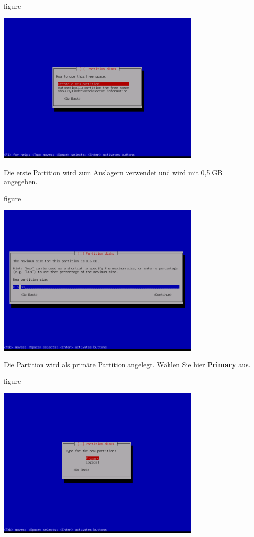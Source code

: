 \begin{nofloat}{figure}
\begin{center}
\includegraphics[width=0.75\textwidth]{screenshots/15_ubuntu_install.png}
\end{center}
\end{nofloat}

Die erste Partition wird zum Auslagern verwendet und wird mit 0,5 GB angegeben.

\begin{nofloat}{figure}
\begin{center}
\includegraphics[width=0.75\textwidth]{screenshots/16_ubuntu_install.png}
\end{center}
\end{nofloat}
\newpage
Die Partition wird als primäre Partition angelegt. Wählen Sie hier
\textbf{Primary} aus.

\begin{nofloat}{figure}
\begin{center}
\includegraphics[width=0.75\textwidth]{screenshots/17_ubuntu_install.png}
\end{center}
\end{nofloat}

